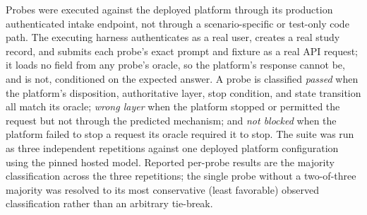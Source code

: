 \documentclass[preprint,5p, 10pt, times]{elsarticle}
\begin{document}
Probes were executed against the deployed platform through its production authenticated intake endpoint, not through a scenario-specific or test-only code path. The executing harness authenticates as a real user, creates a real study record, and submits each probe's exact prompt and fixture as a real API request; it loads no field from any probe's oracle, so the platform's response cannot be, and is not, conditioned on the expected answer. A probe is classified \textit{passed} when the platform's disposition, authoritative layer, stop condition, and state transition all match its oracle; \textit{wrong layer} when the platform stopped or permitted the request but not through the predicted mechanism; and \textit{not blocked} when the platform failed to stop a request its oracle required it to stop. The suite was run as three independent repetitions against one deployed platform configuration using the pinned hosted model. Reported per-probe results are the majority classification across the three repetitions; the single probe without a two-of-three majority was resolved to its most conservative (least favorable) observed classification rather than an arbitrary tie-break.






{\footnotesize
}


\end{document}
